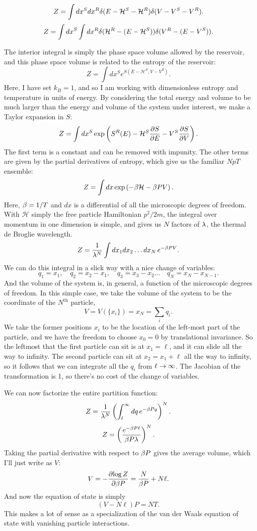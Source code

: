 \documentclass[12pt]{article}
\begin{document}
\[ Z = \int dx^S dx^R \delta(E - \mathcal{H}^S - \mathcal{H}^R) \delta(V - V^S - V^R).\]
\[ Z = \int dx^S \int dx^R \delta(\mathcal{H}^R - (E-\mathcal{H}^S)) \delta(V^R - (E-V^S)).\]

The interior integral is simply the phase space volume allowed by the reservoir, and this phase space volume is related to the entropy of the reservoir:
\[ Z = \int dx^S e^{S(E-\mathcal{H}^S,V-V^S)}.\]
Here, I have set $k_B = 1$, and so I am working with dimensionless entropy and temperature in units of energy. By considering the total energy and volume to be much larger than the energy and volume of the system under interest, we make a Taylor expansion in $S$:
\[ Z = \int dx^S \exp\left(S^R(E) - \mathcal{H}^S\frac{\partial {S}}{\partial {E}} - V^S \frac{\partial {S}}{\partial {V}}\right).\]
The first term is a constant and can be removed with impunity. The other terms are given by the partial derivatives of entropy, which give us the familiar $NpT$ ensemble:
\[ Z = \int dx \exp\left(-\beta \mathcal{H} - \beta P V\right).\]
Here, $\beta = 1/T$ and $dx$ is a differential of all the microscopic degrees of freedom. With $\mathcal{H}$ simply the free particle Hamiltonian $p^2/2m$, the integral over momentum in one dimension is simple, and gives us $N$ factors of $\lambda$, the thermal de Broglie wavelength.
\[ Z = \frac{1}{\lambda^N} \int dx_1 dx_2\ldots dx_N \, e^{-\beta PV}.\]
We can do this integral in a slick way with a nice change of variables:
\[ q_1 = x_1,\quad q_2 = x_2 - x_1,\quad q_3 = x_3 - x_2\ldots \quad q_N = x_N - x_{N-1}.\]
And the volume of the system is, in general, a function of the microscopic degrees of freedom. In this simple case, we take the volume of the system to be the coordinate of the $N^\mathrm{th}$ particle,
\[ V = V(\{x_i\}) = x_N = \sum_i q_i.\]
We take the former positions $x_i$ to be the location of the left-most part of the particle, and we have the freedom to choose $x_0=0$ by translational invariance. So the leftmost that the first particle can sit is at $x_1 = \ell$, and it can slide all the way to infinity. The second particle can sit at $x_2 = x_1+\ell$ all the way to infinity, so it follows that we can integrate all the $q_i$ from $\ell\rightarrow \infty$. The Jacobian of the transformation is 1, so there's no cost of the change of variables.

We can now factorize the entire partition function:
\[ Z = \frac{1}{\lambda^N} \left(\int_\ell^\infty dq\, e^{-\beta P q}\right)^N.\]
\[ Z = \left(\frac{e^{-\beta P \ell}}{\beta P \lambda}\right)^N.\]
Taking the partial derivative with respect to $\beta P$ gives the average volume, which I'll just write as $V$:
\[ V = -\frac{\partial {\log Z}}{\partial {\beta P}} = \frac{N}{\beta P } + N\ell.\]
And now the equation of state is simply
\[ \boxed{ (V-N\ell)P = N T.}\]
This makes a lot of sense as a specialization of the van der Waals equation of state with vanishing particle interactions.
\end{document}
